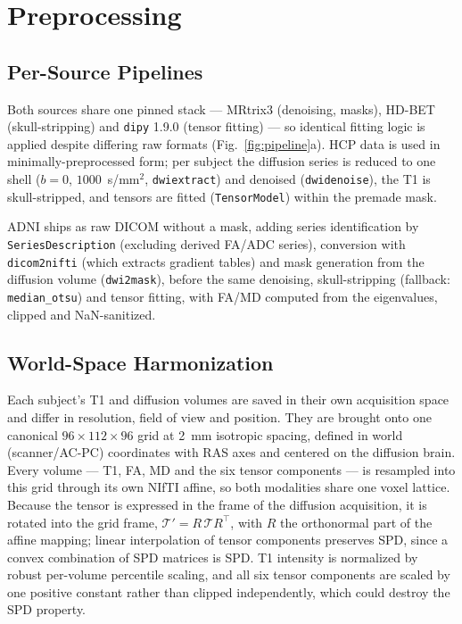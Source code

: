 \documentclass[conference,compsoc]{IEEEtran}
\begin{document}
\section{Preprocessing}
\label{sec:preprocessing}
\subsection{Per-Source Pipelines}
Both sources share one pinned stack --- MRtrix3 (denoising, masks), HD-BET (skull-stripping) and \texttt{dipy} 1.9.0 (tensor fitting) --- so identical fitting logic is applied despite differing raw formats (Fig.~\ref{fig:pipeline}a). HCP data is used in minimally-preprocessed form; per subject the diffusion series is reduced to one shell ($b{=}0$, $1000$~s/mm$^2$, \texttt{dwiextract}) and denoised (\texttt{dwidenoise}), the T1 is skull-stripped, and tensors are fitted (\texttt{TensorModel}) within the premade mask.

ADNI ships as raw DICOM without a mask, adding series identification by \texttt{SeriesDescription} (excluding derived FA/ADC series), conversion with \texttt{dicom2nifti} (which extracts gradient tables) and mask generation from the diffusion volume (\texttt{dwi2mask}), before the same denoising, skull-stripping (fallback: \texttt{median\_otsu}) and tensor fitting, with FA/MD computed from the eigenvalues, clipped and NaN-sanitized.

\subsection{World-Space Harmonization}
\label{sec:harmonization}
Each subject's T1 and diffusion volumes are saved in their own acquisition space and differ in resolution, field of view and position. They are brought onto one canonical $96\times112\times96$ grid at 2~mm isotropic spacing, defined in world (scanner/AC-PC) coordinates with RAS axes and centered on the diffusion brain. Every volume --- T1, FA, MD and the six tensor components --- is resampled into this grid through its own NIfTI affine, so both modalities share one voxel lattice. Because the tensor is expressed in the frame of the diffusion acquisition, it is rotated into the grid frame, $\mathcal{T}'=R\,\mathcal{T}R^\top$, with $R$ the orthonormal part of the affine mapping; linear interpolation of tensor components preserves SPD, since a convex combination of SPD matrices is SPD. T1 intensity is normalized by robust per-volume percentile scaling, and all six tensor components are scaled by one positive constant rather than clipped independently, which could destroy the SPD property.
\end{document}
